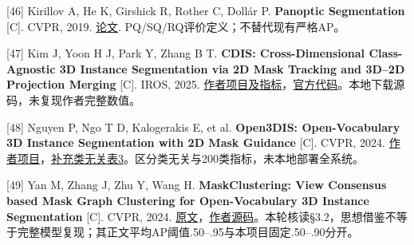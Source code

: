 \documentclass[UTF8,fontset=fandol]{ctexart}
\begin{document}
[46] Kirillov A, He K, Girshick R, Rother C, Dollár P. \textbf{Panoptic Segmentation} [C]. CVPR, 2019. \href{https://arxiv.org/abs/1801.00868}{论文}. PQ/SQ/RQ评价定义；不替代现有严格AP。



[47] Kim J, Yoon H J, Park Y, Zhang B T. \textbf{CDIS: Cross-Dimensional Class-Agnostic 3D Instance Segmentation via 2D Mask Tracking and 3D–2D Projection Merging} [C]. IROS, 2025. \href{https://teamrobi.github.io/projects/cdis/}{作者项目及指标}，\href{https://github.com/teamROBI/CDIS}{官方代码}。本地下载源码，未复现作者完整数值。



[48] Nguyen P, Ngo T D, Kalogerakis E, et al. \textbf{Open3DIS: Open-Vocabulary 3D Instance Segmentation with 2D Mask Guidance} [C]. CVPR, 2024. \href{https://open3dis.github.io/}{作者项目}，\href{https://open3dis.github.io/assets/Open3DIS\_supplementary.pdf}{补充类无关表3}。区分类无关与200类指标，未本地部署全系统。



[49] Yan M, Zhang J, Zhu Y, Wang H. \textbf{MaskClustering: View Consensus based Mask Graph Clustering for Open-Vocabulary 3D Instance Segmentation} [C]. CVPR, 2024. \href{https://arxiv.org/html/2401.07745v2}{原文}，\href{https://github.com/PKU-EPIC/MaskClustering}{作者源码}。本轮核读§3.2，思想借鉴不等于完整模型复现；其正文平均AP阈值.50–.95与本项目固定.50–.90分开。
\end{document}
